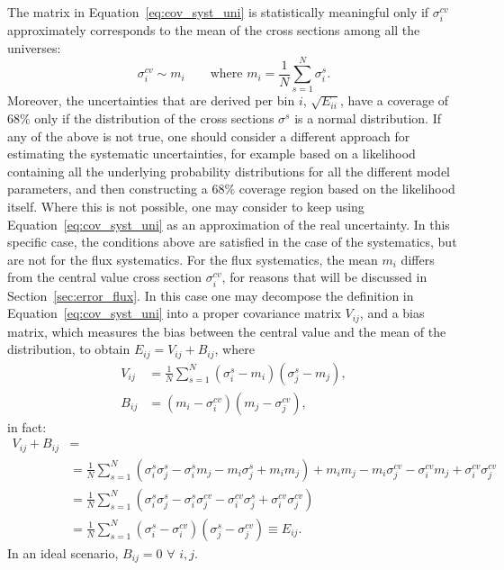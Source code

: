 The matrix in Equation~\eqref{eq:cov_syst_uni} is statistically meaningful only if $\sigma_i^{cv}$ approximately corresponds to the mean of the cross sections among all the universes:
\begin{equation}
\sigma_i^{cv} \sim m_i  \qquad \text{where } m_i = \frac{1}{N} \sum_{s = 1} ^ {N} \sigma_i^s.
\end{equation}
Moreover, the uncertainties that are derived per bin $i$, $\sqrt{E_{ii}}$, have a coverage of $68\%$ only if the distribution of the cross sections $\sigma^s$ is a normal distribution.
If any of the above is not true, one should consider a different approach for estimating the systematic uncertainties, for example based on a likelihood containing all the underlying probability distributions for all the different model parameters, and then constructing a $68\%$ coverage region based on the likelihood itself. Where this is not possible, one may consider to keep using Equation~\eqref{eq:cov_syst_uni} as an approximation of the real uncertainty. In this specific case, the conditions above are satisfied in the case of the \g systematics, but are not for the flux systematics. For the flux systematics, the mean $m_i$ differs from the central value cross section $\sigma_i^{cv}$, for reasons that will be discussed in Section~\ref{sec:error_flux}. In this case one may decompose the definition in Equation~\eqref{eq:cov_syst_uni} into a proper covariance matrix $V_{ij}$, and a bias matrix, which measures the bias between the central value and the mean of the distribution, to obtain $E_{ij} = V_{ij} + B_{ij}$, where
\begin{equation}
\begin{split}
V_{ij} &= \frac{1}{N} \sum_{s = 1} ^ {N} (\sigma_i^s - m_i)(\sigma_j^s - m_j),\\
B_{ij} &= (m_i - \sigma_i^{cv})(m_j - \sigma_j^{cv}),
\end{split}
\end{equation}
in fact:
\begin{equation}
\label{eq:cov_matrix_bias}
\begin{split}
V_{ij} + B_{ij} &= \\
&= \frac{1}{N} \sum_{s = 1} ^ {N} (\sigma_i^s\sigma_j^s - \sigma_i^sm_j - m_i\sigma_j^s + m_im_j) + m_im_j - m_i\sigma_j^{cv} - \sigma_i^{cv}m_j + \sigma_i^{cv}\sigma_j^{cv}\\
&= \frac{1}{N} \sum_{s = 1} ^ {N} (\sigma_i^s\sigma_j^s - \sigma_i^s\sigma_j^{cv} - \sigma_i^{cv}\sigma_j^{s} + \sigma_i^{cv}\sigma_j^{cv}) \\
&= \frac{1}{N} \sum_{s = 1} ^ {N} (\sigma_i^s - \sigma_i^{cv})(\sigma_j^s - \sigma_j^{cv}) \equiv E_{ij}.
\end{split}
\end{equation}
In an ideal scenario, $B_{ij} = 0 \,\, \forall \,\, i,j$.

